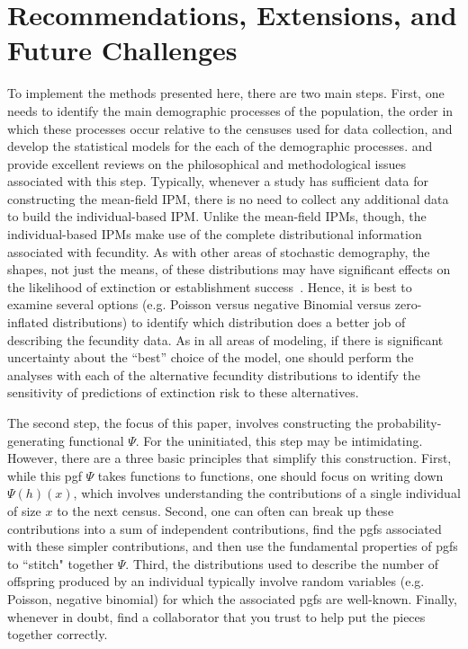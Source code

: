 \documentclass[12pt]{amsart}\usepackage[]{graphicx}\usepackage[]{color}
\begin{document}
\section*{Recommendations, Extensions, and Future Challenges}

To implement the methods presented here, there are two main steps. First, one needs to identify the main demographic processes of the population, the order in which these processes occur relative to the censuses used for data collection, and develop the statistical models for the each of the demographic processes. \citet{rees-etal-14} and \citet{merow-etal-14} provide excellent reviews on the philosophical and methodological issues associated with this step. Typically, whenever a study has sufficient data for constructing the mean-field IPM, there is no need to collect any additional data to build the individual-based IPM.  Unlike the mean-field IPMs, though, the individual-based IPMs make use of the complete distributional information associated with fecundity. As with other areas of stochastic demography, the shapes, not just the means, of these distributions may have significant effects on the likelihood of extinction or establishment success~\citep{nature-05}. Hence, it is best to examine several options (e.g. Poisson versus negative Binomial versus zero-inflated distributions) to identify which distribution does a better job of describing the fecundity data. As in all areas of modeling, if there is significant uncertainty about the ``best'' choice of the model, one should perform the analyses with each of the alternative fecundity distributions to identify the sensitivity of predictions of extinction risk to these alternatives.

The second step, the focus of this paper, involves constructing the probability-generating functional $\Psi$. For the uninitiated, this step may be intimidating. However, there are a three basic principles that simplify this construction. First, while this pgf $\Psi$ takes functions to functions, one should focus on writing down $\Psi(h)(x)$, which involves understanding the contributions of a single individual of size $x$ to the next census. Second, one can often can break up these contributions into a sum of independent contributions, find the pgfs associated with these simpler contributions, and then use the fundamental properties of pgfs to ``stitch" together $\Psi$. Third, the distributions used to describe the number of offspring produced by an individual typically involve random variables (e.g. Poisson, negative binomial) for which the associated pgfs are well-known. Finally, whenever in doubt, find a collaborator that you trust to help put the pieces together correctly.
\end{document}
